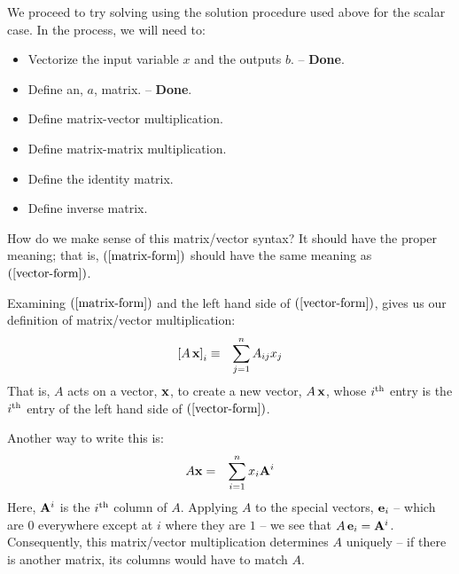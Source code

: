 \documentclass{article}
\begin{document}
We proceed to try solving using the solution procedure used above for the scalar case.
In the process, we will need to:
\begin{itemize}
    \item{Vectorize the input variable $x$ and the outputs $b$. -- {\bf Done}.}
    \item{Define an, $a$, matrix. -- {\bf Done}.}
    \item{Define matrix-vector multiplication.}
    \item{Define matrix-matrix multiplication.}
    \item{Define the identity matrix.}
    \item{Define inverse matrix.}
\end{itemize}

How do we make sense of this matrix/vector syntax? It should have
the proper meaning; that is, $(\ref{matrix-form})$
should have the same meaning as $(\ref{vector-form})$.

Examining $(\ref{matrix-form})$ and the left hand side of
$(\ref{vector-form})$, gives us our definition of matrix/vector multiplication:
\begin{eqnarray}
  \left[A \, {\bf x}\right]_i & \equiv & \sum_{j=1}^n A_{ij} x_j
                                         \label{matrix-vector-mult}
\end{eqnarray}
That is, $A$ acts on a vector, ${\bf x}$, to create a new vector, $A \, {\bf x}$,
whose $i^{\rm th}$ entry is the $i^{\rm th}$ entry of
the left hand side of $(\ref{vector-form})$.

Another way to write this is:
\begin{eqnarray}
  A {\bf x} & = & \sum_{i=1}^n x_i {\bf A}^i
\end{eqnarray}
Here, ${\bf A}^i$ is the $i^{\rm th}$ column of $A$. Applying $A$ to the special
vectors, ${\bf e}_i$
-- which are $0$ everywhere except at $i$ where they are $1$ --
we see that $A \, {\bf e}_i = {\bf A}^i$. Consequently, this matrix/vector
multiplication determines $A$ uniquely
-- if there is another matrix, its columns would have to match $A$.
\end{document}

